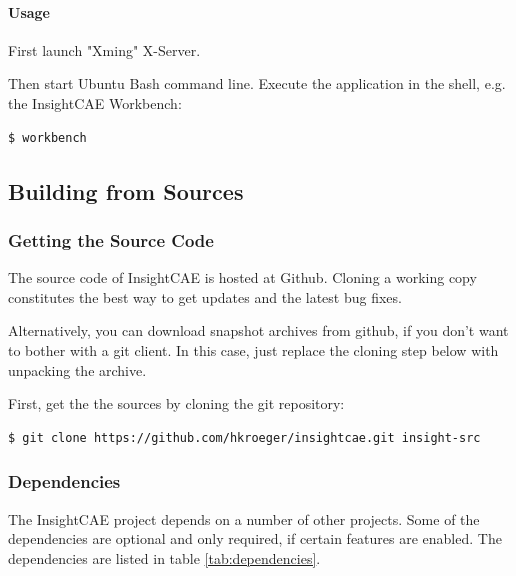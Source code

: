 \paragraph{Usage}
First launch "Xming" X-Server.

Then start Ubuntu Bash command line.
Execute the application in the shell, e.g. the InsightCAE Workbench:
\begin{lstlisting}[language=bash]
$ workbench
\end{lstlisting}

\subsection{Building from Sources}

\subsubsection{Getting the Source Code}

The source code of InsightCAE is hosted at Github. 
Cloning a working copy constitutes the best way to get updates and the latest bug fixes.

Alternatively, you can download snapshot archives from github, if you don't want to bother with a git client.
In this case, just replace the cloning step below with unpacking the archive.

First, get the the sources by cloning the git repository:
\begin{lstlisting}[language=bash]
$ git clone https://github.com/hkroeger/insightcae.git insight-src
\end{lstlisting}


\subsubsection{Dependencies}

The InsightCAE project depends on a number of other projects.
Some of the dependencies are optional and only required, if certain features are enabled.
The dependencies are listed in table \ref{tab:dependencies}.

